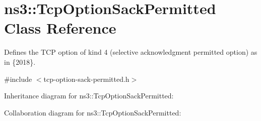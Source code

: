 \hypertarget{classns3_1_1TcpOptionSackPermitted}{}\section{ns3\+:\+:Tcp\+Option\+Sack\+Permitted Class Reference}
\label{classns3_1_1TcpOptionSackPermitted}


Defines the T\+CP option of kind 4 (selective acknowledgment permitted option) as in \{2018\}.  




{\ttfamily \#include $<$tcp-\/option-\/sack-\/permitted.\+h$>$}



Inheritance diagram for ns3\+:\+:Tcp\+Option\+Sack\+Permitted\+:


Collaboration diagram for ns3\+:\+:Tcp\+Option\+Sack\+Permitted\+:
